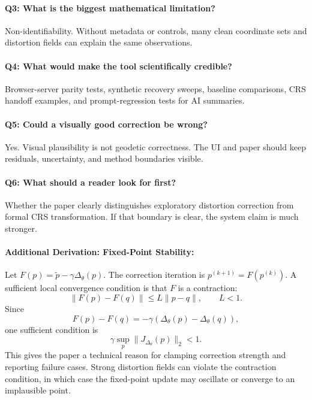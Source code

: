 \documentclass{article}
\begin{document}
\paragraph{Q3: What is the biggest mathematical limitation?}
Non-identifiability. Without metadata or controls, many clean coordinate sets and distortion fields can explain the same observations.

\paragraph{Q4: What would make the tool scientifically credible?}
Browser-server parity tests, synthetic recovery sweeps, baseline comparisons, CRS handoff examples, and prompt-regression tests for AI summaries.

\paragraph{Q5: Could a visually good correction be wrong?}
Yes. Visual plausibility is not geodetic correctness. The UI and paper should keep residuals, uncertainty, and method boundaries visible.

\paragraph{Q6: What should a reader look for first?}
Whether the paper clearly distinguishes exploratory distortion correction from formal CRS transformation. If that boundary is clear, the system claim is much stronger.

\paragraph{Additional Derivation: Fixed-Point Stability:}

Let $F(p)=\tilde{p}-\gamma\Delta_{\theta}(p)$. The correction iteration is $p^{(k+1)}=F(p^{(k)})$. A sufficient local convergence condition is that $F$ is a contraction:
\begin{equation}
  \|F(p)-F(q)\| \leq L\|p-q\|,\qquad L<1.
\end{equation}
Since
\begin{equation}
  F(p)-F(q)=-\gamma(\Delta_{\theta}(p)-\Delta_{\theta}(q)),
\end{equation}
one sufficient condition is
\begin{equation}
  \gamma\sup_{p}\|J_{\Delta_{\theta}}(p)\|_2<1.
\end{equation}
This gives the paper a technical reason for clamping correction strength and reporting failure cases. Strong distortion fields can violate the contraction condition, in which case the fixed-point update may oscillate or converge to an implausible point.
\end{document}
